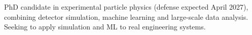 

\begin{cvparagraph}

PhD candidate in experimental particle physics (defense expected April 2027), combining detector simulation, machine learning and large-scale data analysis. Seeking to apply simulation and ML to real engineering systems.
\end{cvparagraph}

